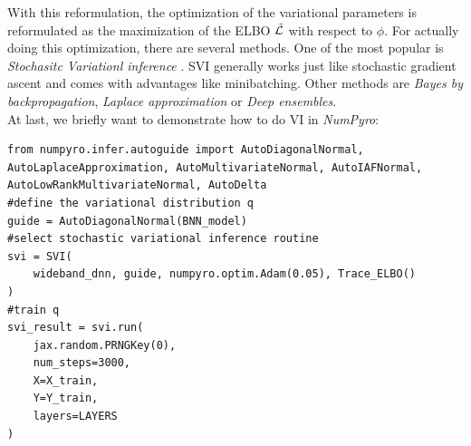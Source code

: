 \documentclass{article}
\begin{document}
With this reformulation, the optimization of the variational parameters is reformulated as the maximization of the ELBO $\Tilde{\mathcal{L}}$ with respect to $\phi$. For actually doing this optimization, there are several methods. One of the most popular is \textit{Stochasitc Variationl inference} \cite{hoffman2013stochasticvariationalinference}. SVI generally works just like stochastic gradient ascent \cite{BNNTut} and comes with advantages like minibatching. Other methods are \textit{Bayes by backpropagation}, \textit{Laplace approximation} or \textit{Deep ensembles}.\\
At last, we briefly want to demonstrate how to do VI in \textit{NumPyro}:
\begin{lstlisting}[caption= {Inference with VI},captionpos=t]
from numpyro.infer.autoguide import AutoDiagonalNormal, AutoLaplaceApproximation, AutoMultivariateNormal, AutoIAFNormal, AutoLowRankMultivariateNormal, AutoDelta
#define the variational distribution q
guide = AutoDiagonalNormal(BNN_model)
#select stochastic variational inference routine
svi = SVI(
    wideband_dnn, guide, numpyro.optim.Adam(0.05), Trace_ELBO()
)
#train q
svi_result = svi.run(
    jax.random.PRNGKey(0),
    num_steps=3000,
    X=X_train,
    Y=Y_train,
    layers=LAYERS
)
\end{lstlisting}
\end{document}

